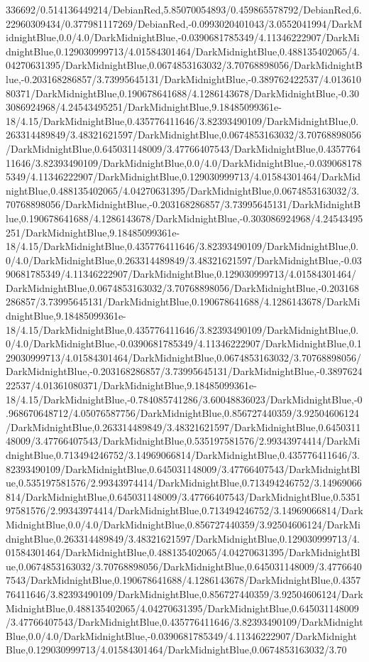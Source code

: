 {\begin{tikzternal}
{336692/0.514136449214/DebianRed,5.85070054893/0.459865578792/DebianRed,6.22960309434/0.377981117269/DebianRed,-0.0993020401043/3.0552041994/DarkMidnightBlue,0.0/4.0/DarkMidnightBlue,-0.0390681785349/4.11346222907/DarkMidnightBlue,0.129030999713/4.01584301464/DarkMidnightBlue,0.488135402065/4.04270631395/DarkMidnightBlue,0.0674853163032/3.70768898056/DarkMidnightBlue,-0.203168286857/3.73995645131/DarkMidnightBlue,-0.389762422537/4.01361080371/DarkMidnightBlue,0.190678641688/4.1286143678/DarkMidnightBlue,-0.303086924968/4.24543495251/DarkMidnightBlue,9.18485099361e-18/4.15/DarkMidnightBlue,0.435776411646/3.82393490109/DarkMidnightBlue,0.263314489849/3.48321621597/DarkMidnightBlue,0.0674853163032/3.70768898056/DarkMidnightBlue,0.645031148009/3.47766407543/DarkMidnightBlue,0.435776411646/3.82393490109/DarkMidnightBlue,0.0/4.0/DarkMidnightBlue,-0.0390681785349/4.11346222907/DarkMidnightBlue,0.129030999713/4.01584301464/DarkMidnightBlue,0.488135402065/4.04270631395/DarkMidnightBlue,0.0674853163032/3.70768898056/DarkMidnightBlue,-0.203168286857/3.73995645131/DarkMidnightBlue,0.190678641688/4.1286143678/DarkMidnightBlue,-0.303086924968/4.24543495251/DarkMidnightBlue,9.18485099361e-18/4.15/DarkMidnightBlue,0.435776411646/3.82393490109/DarkMidnightBlue,0.0/4.0/DarkMidnightBlue,0.263314489849/3.48321621597/DarkMidnightBlue,-0.0390681785349/4.11346222907/DarkMidnightBlue,0.129030999713/4.01584301464/DarkMidnightBlue,0.0674853163032/3.70768898056/DarkMidnightBlue,-0.203168286857/3.73995645131/DarkMidnightBlue,0.190678641688/4.1286143678/DarkMidnightBlue,9.18485099361e-18/4.15/DarkMidnightBlue,0.435776411646/3.82393490109/DarkMidnightBlue,0.0/4.0/DarkMidnightBlue,-0.0390681785349/4.11346222907/DarkMidnightBlue,0.129030999713/4.01584301464/DarkMidnightBlue,0.0674853163032/3.70768898056/DarkMidnightBlue,-0.203168286857/3.73995645131/DarkMidnightBlue,-0.389762422537/4.01361080371/DarkMidnightBlue,9.18485099361e-18/4.15/DarkMidnightBlue,-0.784085741286/3.60048836023/DarkMidnightBlue,-0.968670648712/4.05076587756/DarkMidnightBlue,0.856727440359/3.92504606124/DarkMidnightBlue,0.263314489849/3.48321621597/DarkMidnightBlue,0.645031148009/3.47766407543/DarkMidnightBlue,0.535197581576/2.99343974414/DarkMidnightBlue,0.713494246752/3.14969066814/DarkMidnightBlue,0.435776411646/3.82393490109/DarkMidnightBlue,0.645031148009/3.47766407543/DarkMidnightBlue,0.535197581576/2.99343974414/DarkMidnightBlue,0.713494246752/3.14969066814/DarkMidnightBlue,0.645031148009/3.47766407543/DarkMidnightBlue,0.535197581576/2.99343974414/DarkMidnightBlue,0.713494246752/3.14969066814/DarkMidnightBlue,0.0/4.0/DarkMidnightBlue,0.856727440359/3.92504606124/DarkMidnightBlue,0.263314489849/3.48321621597/DarkMidnightBlue,0.129030999713/4.01584301464/DarkMidnightBlue,0.488135402065/4.04270631395/DarkMidnightBlue,0.0674853163032/3.70768898056/DarkMidnightBlue,0.645031148009/3.47766407543/DarkMidnightBlue,0.190678641688/4.1286143678/DarkMidnightBlue,0.435776411646/3.82393490109/DarkMidnightBlue,0.856727440359/3.92504606124/DarkMidnightBlue,0.488135402065/4.04270631395/DarkMidnightBlue,0.645031148009/3.47766407543/DarkMidnightBlue,0.435776411646/3.82393490109/DarkMidnightBlue,0.0/4.0/DarkMidnightBlue,-0.0390681785349/4.11346222907/DarkMidnightBlue,0.129030999713/4.01584301464/DarkMidnightBlue,0.0674853163032/3.70}
\end{tikzternal}}
